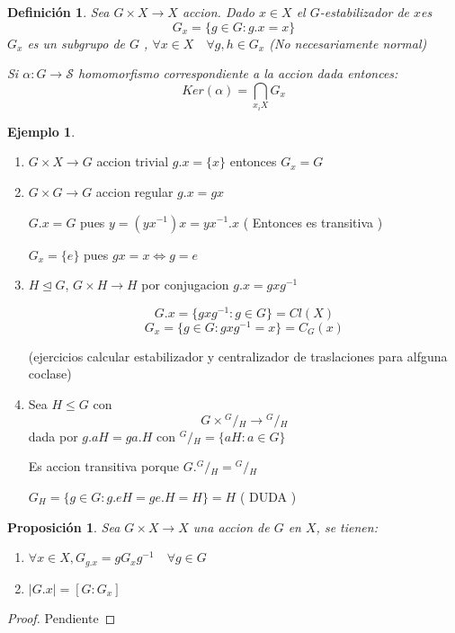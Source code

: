 \documentclass[10pt]{extarticle}
\theoremstyle{break}
\newtheorem{proposition}{Proposición}
\newtheorem{definition}{Definición}[section]
\theoremstyle{definition}
\newtheorem{example}{Ejemplo}[section]
\newcommand\quotient[2]{{^{\displaystyle #1}}/{_{\displaystyle #2}}}
\begin{document}
\begin{definition}
	Sea $G\times X\longrightarrow X$ accion. Dado $x\in X$ el $G$-estabilizador de $x$es $$G_{x}=\{g\in G: g.x=x\}$$
	$G_{x}$ es un subgrupo de $G$ , $\forall x\in X\quad\forall g,h\in G_{x}$ (No necesariamente normal)

	Si $\alpha :G\longrightarrow \mathcal{S}$ homomorfismo correspondiente a la accion dada entonces: $$Ker(\alpha)=\bigcap_{x_{i} X}G_{x}$$
\end{definition}

\begin{example}
	\begin{enumerate}
		\item $G\times X\longrightarrow G$ accion trivial $g.x=\{x\}$ entonces $G_{x}=G$
		\item $G\times G \longrightarrow G$ accion regular $g.x=gx$
			
			$G.x=G$ pues $y=(yx^{-1} )x=yx^{-1}.x$ ( Entonces es transitiva )

			$G_{x}=\{e\}$ pues $gx=x\iff g=e$
		\item $H\trianglelefteq G$, $G\times H \longrightarrow H$ por conjugacion $g.x=gxg^{-1} $

			$$G.x=\{gxg^{-1} : g\in G \}=Cl(X)$$
			$$G_{x}=\{g\in G: gxg^{-1} =x\}=C_{G}(x)$$

			(ejercicios calcular estabilizador y centralizador de traslaciones para alfguna coclase)
		\item Sea $H\leq G$ con 
			$$G\times \quotient{G}{H}\longrightarrow \quotient{G}{H}$$ 
			dada por $g.aH=ga.H$ con $\quotient{G}{H}=\{aH: a\in G \}$

			Es accion transitiva porque $G.\quotient{G}{H}=\quotient{G}{H}$

			$G_{H}=\{g\in G : g.eH=ge.H=H\}=H$ ( DUDA )
	\end{enumerate}
\end{example}

\begin{proposition}
	Sea $G\times X\longrightarrow X$ una accion de $G$ en $X$, se tienen:
	\begin{enumerate} 
		\item $\forall x\in X,G_{g.x}=gG_{x}g^{-1} \quad\forall g\in G$
		\item $ \lvert G.x\rvert =[G:G_{x}] $ 
	\end{enumerate}
\end{proposition}

\begin{proof}
	Pendiente
\end{proof}
\end{document}
